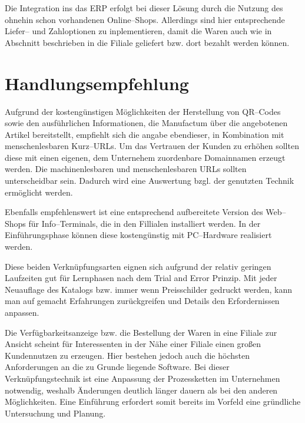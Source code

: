 Die Integration ins das \ac{ERP} erfolgt bei dieser Lösung durch die Nutzung des ohnehin schon vorhandenen Online–Shops. Allerdings sind hier entsprechende Liefer-- und Zahloptionen zu inplementieren, damit die Waren auch wie in Abschnitt  beschrieben in die Filiale geliefert bzw. dort bezahlt werden können. 

\section{Handlungsempfehlung}

Aufgrund der kostengünstigen Möglichkeiten der Herstellung von QR--Codes sowie den ausführlichen Informationen, die Manufactum über die angebotenen Artikel bereitstellt, empfiehlt sich die angabe ebendieser, in Kombination mit menschenlesbaren Kurz--URLs. Um das Vertrauen der Kunden zu erhöhen sollten diese mit einen eigenen, dem Unternehem zuordenbare Domainnamen erzeugt werden. Die machinenlesbaren und menschenlesbaren URLs sollten unterscheidbar sein. Dadurch wird eine Auswertung bzgl. der genutzten Technik ermöglicht werden.

Ebenfalls empfehlenswert ist eine entsprechend aufbereitete Version des Web--Shops für Info--Terminals, die in den Fillialen installiert werden. In der Einführungsphase können diese kostengünstig mit PC--Hardware realisiert werden.

Diese beiden Verknüpfungsarten eignen sich aufgrund der relativ geringen Laufzeiten gut für Lernphasen nach dem Trial and Error Prinzip. Mit jeder Neuauflage des Katalogs bzw. immer wenn Preisschilder gedruckt werden, kann man auf gemacht Erfahrungen zurückgreifen und Details den Erfordernissen anpassen.

Die Verfügbarkeitsanzeige bzw. die Bestellung der Waren in eine Filiale zur Ansicht scheint für Interessenten in der Nähe einer Filiale einen großen Kundennutzen zu erzeugen. Hier bestehen jedoch auch die höchsten Anforderungen an die zu Grunde liegende Software. Bei dieser Verknüpfungstechnik ist eine Anpassung der Prozessketten im Unternehmen notwendig, weshalb Änderungen deutlich länger dauern als bei den anderen Möglichkeiten. Eine Einführung erfordert somit bereits im Vorfeld eine gründliche Untersuchung und Planung. 










